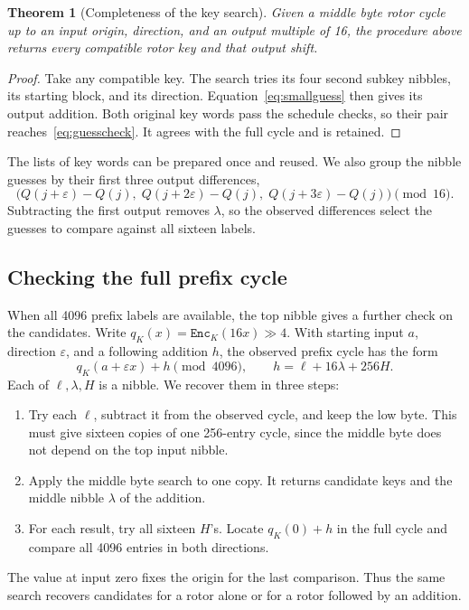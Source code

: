 \documentclass[11pt]{article}
\newtheorem{theorem}{Theorem}[section]
\begin{document}
\begin{theorem}[Completeness of the key search]\label{thm:middlecomplete}
Given a middle byte rotor cycle up to an input origin, direction, and
an output multiple of 16, the procedure above returns every
compatible rotor key and that output shift.
\end{theorem}
\begin{proof}
Take any compatible key. The search tries its four second subkey nibbles,
its starting block, and its direction. Equation~\eqref{eq:smallguess}
then gives its output addition. Both original key words pass the
schedule checks, so their pair reaches~\eqref{eq:guesscheck}.
It agrees with the full cycle and is retained.
\end{proof}

The lists of key words can be prepared once and reused. We also group
the nibble guesses by their first three output differences,
\[
 \bigl(Q(j+\varepsilon)-Q(j),\;
 Q(j+2\varepsilon)-Q(j),\;
 Q(j+3\varepsilon)-Q(j)\bigr)\pmod {16}.
\]
Subtracting the first output removes \(\lambda\), so the observed
differences select the guesses to compare against all sixteen labels.

\subsection{Checking the full prefix cycle}\label{sec:prefixcheck}
When all 4096 prefix labels are available, the top nibble gives a further
check on the candidates. Write
\(q_K(x)=\mathtt{Enc}_K(16x)\gg4\).
With starting input \(a\), direction \(\varepsilon\), and a following
addition \(h\), the observed prefix cycle has the form
\begin{equation}
 q_K(a+\varepsilon x)+h\pmod {4096},
 \qquad h=\ell+16\lambda+256H.
 \label{eq:cycle}
\end{equation}
Each of \(\ell,\lambda,H\) is a nibble. We recover them in three steps:
\begin{enumerate}
\item Try each \(\ell\), subtract it from the observed cycle, and keep
the low byte. This must give sixteen copies of one 256-entry cycle,
since the middle byte does not depend on the top input nibble.
\item Apply the middle byte search to one copy. It returns candidate
keys and the middle nibble \(\lambda\) of the addition.
\item For each result, try all sixteen \(H\)'s. Locate \(q_K(0)+h\)
in the full cycle and compare all 4096 entries in both directions.
\end{enumerate}
The value at input zero fixes the origin for the last comparison.
Thus the same search recovers candidates for a rotor alone or for a
rotor followed by an addition. 
\end{document}
